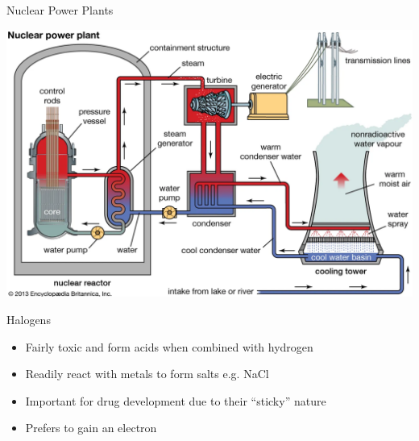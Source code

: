 \documentclass[11pt]{beamer}
\begin{document}
\begin{frame}{Nuclear Power Plants}
  \begin{center}
    \includegraphics[width=\linewidth]{nuclear_plant}
  \end{center}
\end{frame}

\begin{frame}{Halogens}
  \begin{itemize}
  \item Fairly toxic and form acids when combined with
    hydrogen
  \item Readily react with metals to form salts e.g.
    NaCl
  \item Important for drug development due to their ``sticky''
    nature
  \item Prefers to gain an electron
  \end{itemize}
\end{frame}
\end{document}
